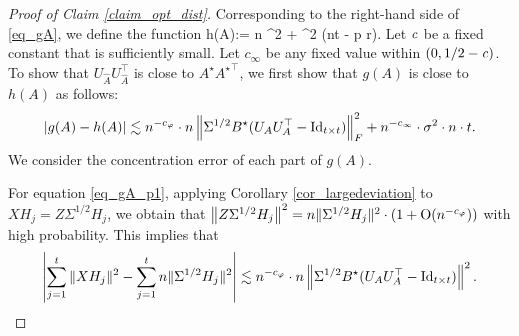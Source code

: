 	\begin{proof}[Proof of Claim \ref{claim_opt_dist}]
	Corresponding to the right-hand side of \eqref{eq_gA}, we define the function
	\be\label{same_hA}h(A):= n ^2 + \sigma^2 (n\cdot t - p \cdot r).\ee
	Let ${\mathit{c}}$ be a fixed constant that is sufficiently small.
	Let $c_{\infty}$ be any fixed value within $(0, 1/2 - {\mathit{c}})$.
	To show that $U_{\hat{A}}U_{\hat{A}}^\top$ is close to $A^\star {A^\star}^\top$, we first show that $g(A)$ is close to $h(A)$ as follows:
	\begin{align}\label{eq_gA_err}
		{\left| {g(A) - h(A)} \right|} \lesssim  n^{-c_{\varphi}} \cdot n \left\| \Sigma^{1/2} B^{\star} (U_AU_A^{\top} - \operatorname{Id}_{t\times t}) \right\|_F^2 + n^{-c_{\infty}} \cdot \sigma^2 \cdot n \cdot t.
	\end{align}
	We consider the concentration error of each part of $g(A)$.

	For equation \eqref{eq_gA_p1}, %
	applying Corollary \ref{cor_largedeviation} to $X H_j = Z \Sigma^{1/2} H_j$, we obtain that 
	${\left\|Z \Sigma^{1/2} H_j \right\|^2 } = { n \|\Sigma^{1/2} H_j\|^2} \cdot (1 + \operatorname{O}(n^{-c_\varphi}))$ with high probability. 
	This implies that
	\begin{align}
		\left\lvert\sum_{j=1}^t \|X H_j\|^2 -  \sum_{j=1}^t n\|\Sigma^{1/2} H_j\|^2\right\rvert \lesssim   n^{-c_{\varphi}} \cdot n  \left\| \Sigma^{1/2} B^{\star} (U_{A}U_A^{\top} - \operatorname{Id}_{t\times t}) \right\|^2. \label{eq_gA_err1}
	\end{align}


\end{proof}
